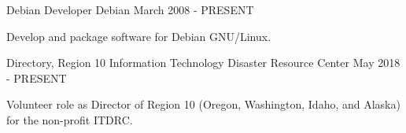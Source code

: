 
\begin{cventries}
  \cventry
    {Debian Developer} %
    {Debian} %
    {}
    {March 2008 - PRESENT} %
    {
      \begin{cvitems} %
        \item {Develop and package software for Debian GNU/Linux.}
      \end{cvitems}
    }

  \cventry
    {Directory, Region 10} %
    {Information Technology Disaster Resource Center} %
    {}
    {May 2018 - PRESENT} %
    {
      \begin{cvitems} %
        \item {Volunteer role as Director of Region 10 (Oregon, Washington, Idaho, and Alaska) for the non-profit ITDRC.}
      \end{cvitems}
    }
\end{cventries}
